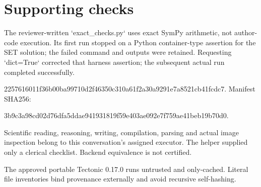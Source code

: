 \documentclass[10pt]{article}
\begin{document}
\section*{Supporting checks}
The reviewer-written `exact\_checks.py` uses exact SymPy arithmetic, not author-code execution. Its first run stopped on a Python container-type assertion for the SET solution; the failed command and outputs were retained. Requesting `dict=True` corrected that harness assertion; the subsequent actual run completed successfully.\par
2257616011f36b00ba99710d2f46350c310a61f2a30a9291e7a8521cb41fcdc7. Manifest SHA256:\par
3b9c3a98cd02d76dfa5ddae941931819f59e403ae092e7f759ae41beb19b70d0.\par
Scientific reading, reasoning, writing, compilation, parsing and actual image inspection belong to this conversation’s assigned executor. The helper supplied only a clerical checklist. Backend equivalence is not certified.\par
The approved portable Tectonic 0.17.0 runs untrusted and only-cached. Literal file inventories bind provenance externally and avoid recursive self-hashing.\par
\end{document}
